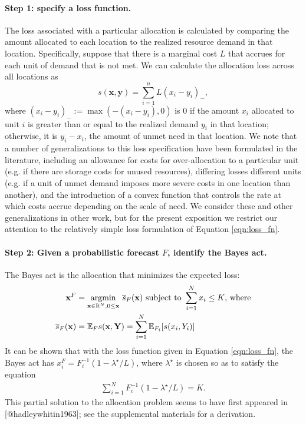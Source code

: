 \documentclass{article}
\begin{document}
\paragraph{Step 1: specify a loss function.} The loss associated with a particular allocation is calculated by comparing the amount allocated to each location to the realized resource demand in that location. Specifically, suppose that there is a marginal cost $L$ that accrues for each unit of demand that is not met. We can calculate the allocation loss across all locations as
\begin{equation}
s(\mathbf{x}, \mathbf{y}) = \sum_{i=1}^n L (x_i - y_i)_-, \label{eqn:loss_fn}
\end{equation}
where $(x_i - y_i)_- := \max(-(x_i - y_i),0)$ is $0$ if the amount $x_i$ allocated to unit $i$ is greater than or equal to the realized demand $y_i$ in that location; otherwise, it is $y_i - x_i$, the amount of unmet need in that location. We note that a number of generalizations to this loss specification have been formulated in the literature, including an allowance for costs for over-allocation to a particular unit (e.g. if there are storage costs for unused resources), differing losses different units (e.g. if a unit of unmet demand imposes more severe costs in one location than another), and the introduction of a convex function that controls the rate at which costs accrue depending on the scale of need. We consider these and other generalizations in other work, but for the present exposition we restrict our attention to the relatively simple loss formulation of Equation \eqref{eqn:loss_fn}.

\paragraph{Step 2: Given a probabilistic forecast $F$, identify the Bayes act.} The Bayes act is the allocation that minimizes the expected loss:
\begin{align}
    \mathbf{x}^F &= \underset{\mathbf{x}\in \mathbb{R}^N, 0 \leq \mathbf{x}}{\mathrm{arg min}}\,\, \overline{s}_F(\mathbf{x}) \text{ subject to } 
    \sum_{i=1}^N x_i \leq K \text{, where} \label{AP} \\
    \overline{s}_F(\mathbf{x}) &= \mathbb{E}_{F} s(\mathbf{x}, \mathbf{Y}) = \sum_{i=1}^{N} \mathbb{E}_{F_i}[s(x_i, Y_i)] \label{eqn:sbar}
\end{align}
It can be shown that with the loss function given in Equation \eqref{eqn:loss_fn}, the Bayes act has $x^F_i = F_i^{-1}(1 - \lambda^{\star}/L)$, where $\lambda^{\star}$ is chosen so as to satisfy the equation
\begin{align}
\sum_{i=1}^{N}F_i^{-1}(1 - \lambda^{\star}/L) = K.
\end{align}
This partial solution to the allocation problem seems to have first appeared in [@hadleywhitin1963]; see the supplemental materials for a derivation.
\end{document}
